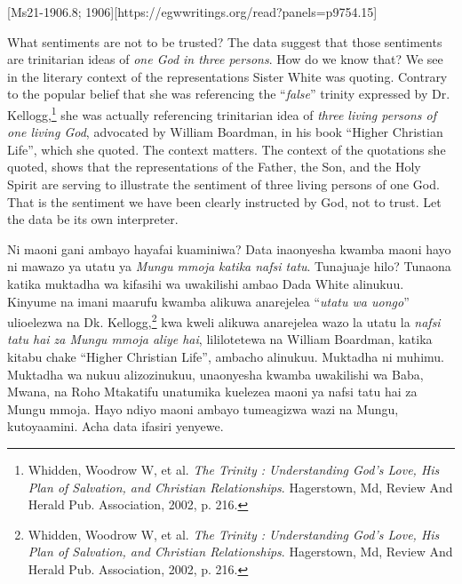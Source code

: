 [Ms21-1906.8; 1906][https://egwwritings.org/read?panels=p9754.15]


What sentiments are not to be trusted? The data suggest that those sentiments are trinitarian ideas of \textit{one God in three persons}. How do we know that? We see in the literary context of the representations Sister White was quoting. Contrary to the popular belief that she was referencing the “\textit{false}” trinity expressed by Dr. Kellogg,\footnote{Whidden, Woodrow W, et al. \textit{The Trinity : Understanding God’s Love, His Plan of Salvation, and Christian Relationships}. Hagerstown, Md, Review And Herald Pub. Association, 2002, p. 216.} she was actually referencing trinitarian idea of \textit{three living persons of one living God}, advocated by William Boardman, in his book “Higher Christian Life”, which she quoted. The context matters. The context of the quotations she quoted, shows that the representations of the Father, the Son, and the Holy Spirit are serving to illustrate the sentiment of three living persons of one God. That is the sentiment we have been clearly instructed by God, not to trust. Let the data be its own interpreter.


Ni maoni gani ambayo hayafai kuaminiwa? Data inaonyesha kwamba maoni hayo ni mawazo ya utatu ya \textit{Mungu mmoja katika nafsi tatu}. Tunajuaje hilo? Tunaona katika muktadha wa kifasihi wa uwakilishi ambao Dada White alinukuu. Kinyume na imani maarufu kwamba alikuwa anarejelea “\textit{utatu wa uongo}” ulioelezwa na Dk. Kellogg,\footnote{Whidden, Woodrow W, et al. \textit{The Trinity : Understanding God's Love, His Plan of Salvation, and Christian Relationships}. Hagerstown, Md, Review And Herald Pub. Association, 2002, p. 216.} kwa kweli alikuwa anarejelea wazo la utatu la \textit{nafsi tatu hai za Mungu mmoja aliye hai}, lililotetewa na William Boardman, katika kitabu chake “Higher Christian Life”, ambacho alinukuu. Muktadha ni muhimu. Muktadha wa nukuu alizozinukuu, unaonyesha kwamba uwakilishi wa Baba, Mwana, na Roho Mtakatifu unatumika kuelezea maoni ya nafsi tatu hai za Mungu mmoja. Hayo ndiyo maoni ambayo tumeagizwa wazi na Mungu, kutoyaamini. Acha data ifasiri yenyewe.


